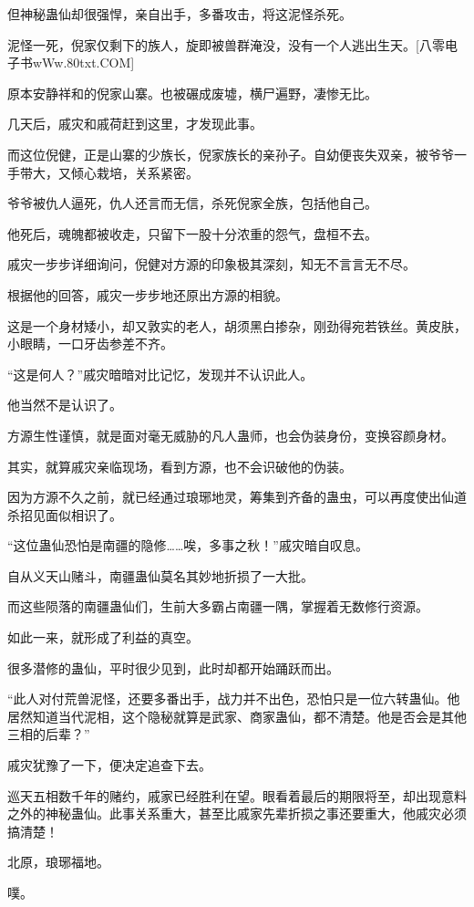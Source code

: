 \begin{this_body}
但神秘蛊仙却很强悍，亲自出手，多番攻击，将这泥怪杀死。

泥怪一死，倪家仅剩下的族人，旋即被兽群淹没，没有一个人逃出生天。[八零电子书wWw.80txt.COM]

原本安静祥和的倪家山寨。也被碾成废墟，横尸遍野，凄惨无比。

几天后，戚灾和戚荷赶到这里，才发现此事。

而这位倪健，正是山寨的少族长，倪家族长的亲孙子。自幼便丧失双亲，被爷爷一手带大，又倾心栽培，关系紧密。

爷爷被仇人逼死，仇人还言而无信，杀死倪家全族，包括他自己。

他死后，魂魄都被收走，只留下一股十分浓重的怨气，盘桓不去。

戚灾一步步详细询问，倪健对方源的印象极其深刻，知无不言言无不尽。

根据他的回答，戚灾一步步地还原出方源的相貌。

这是一个身材矮小，却又敦实的老人，胡须黑白掺杂，刚劲得宛若铁丝。黄皮肤，小眼睛，一口牙齿参差不齐。

“这是何人？”戚灾暗暗对比记忆，发现并不认识此人。

他当然不是认识了。

方源生性谨慎，就是面对毫无威胁的凡人蛊师，也会伪装身份，变换容颜身材。

其实，就算戚灾亲临现场，看到方源，也不会识破他的伪装。

因为方源不久之前，就已经通过琅琊地灵，筹集到齐备的蛊虫，可以再度使出仙道杀招见面似相识了。

“这位蛊仙恐怕是南疆的隐修……唉，多事之秋！”戚灾暗自叹息。

自从义天山赌斗，南疆蛊仙莫名其妙地折损了一大批。

而这些陨落的南疆蛊仙们，生前大多霸占南疆一隅，掌握着无数修行资源。

如此一来，就形成了利益的真空。

很多潜修的蛊仙，平时很少见到，此时却都开始踊跃而出。

“此人对付荒兽泥怪，还要多番出手，战力并不出色，恐怕只是一位六转蛊仙。他居然知道当代泥相，这个隐秘就算是武家、商家蛊仙，都不清楚。他是否会是其他三相的后辈？”

戚灾犹豫了一下，便决定追查下去。

巡天五相数千年的赌约，戚家已经胜利在望。眼看着最后的期限将至，却出现意料之外的神秘蛊仙。此事关系重大，甚至比戚家先辈折损之事还要重大，他戚灾必须搞清楚！

北原，琅琊福地。

噗。


\end{this_body}

